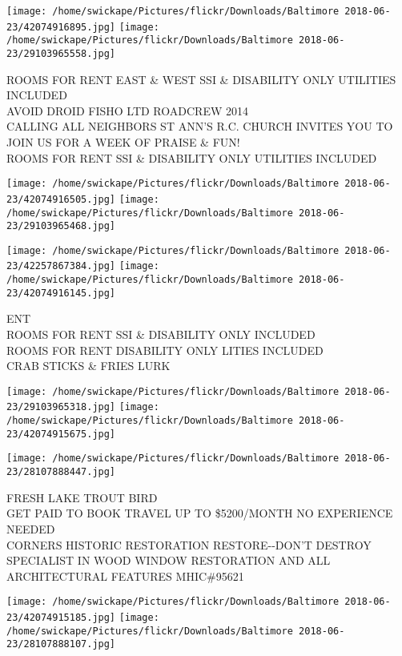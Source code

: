 \documentclass[10pt,letterpaper]{article}
\begin{document}
\texttt{[image: /home/swickape/Pictures/flickr/Downloads/Baltimore 2018-06-23/42074916895.jpg]}
\texttt{[image: /home/swickape/Pictures/flickr/Downloads/Baltimore 2018-06-23/29103965558.jpg]}

ROOMS FOR RENT EAST \& WEST SSI \& DISABILITY ONLY UTILITIES INCLUDED\\
AVOID DROID FISHO LTD ROADCREW 2014\\
CALLING ALL NEIGHBORS ST ANN'S R.C. CHURCH INVITES YOU TO JOIN US FOR A WEEK OF PRAISE \& FUN!\\
ROOMS FOR RENT SSI \& DISABILITY ONLY UTILITIES INCLUDED\\
\pagebreak

\texttt{[image: /home/swickape/Pictures/flickr/Downloads/Baltimore 2018-06-23/42074916505.jpg]}
\texttt{[image: /home/swickape/Pictures/flickr/Downloads/Baltimore 2018-06-23/29103965468.jpg]}

\texttt{[image: /home/swickape/Pictures/flickr/Downloads/Baltimore 2018-06-23/42257867384.jpg]}
\texttt{[image: /home/swickape/Pictures/flickr/Downloads/Baltimore 2018-06-23/42074916145.jpg]}

ENT\\
ROOMS FOR RENT SSI \& DISABILITY ONLY INCLUDED\\
ROOMS FOR RENT DISABILITY ONLY LITIES INCLUDED\\
CRAB STICKS \& FRIES LURK\\
\pagebreak

\texttt{[image: /home/swickape/Pictures/flickr/Downloads/Baltimore 2018-06-23/29103965318.jpg]}
\texttt{[image: /home/swickape/Pictures/flickr/Downloads/Baltimore 2018-06-23/42074915675.jpg]}

\vspace{0.25in}
\texttt{[image: /home/swickape/Pictures/flickr/Downloads/Baltimore 2018-06-23/28107888447.jpg]}

FRESH LAKE TROUT BIRD\\
GET PAID TO BOOK TRAVEL UP TO \$5200/MONTH NO EXPERIENCE NEEDED\\
CORNERS HISTORIC RESTORATION RESTORE{-}{-}DON'T DESTROY SPECIALIST IN WOOD WINDOW RESTORATION AND ALL ARCHITECTURAL FEATURES MHIC\#95621\\
\pagebreak

\texttt{[image: /home/swickape/Pictures/flickr/Downloads/Baltimore 2018-06-23/42074915185.jpg]}
\texttt{[image: /home/swickape/Pictures/flickr/Downloads/Baltimore 2018-06-23/28107888107.jpg]}
\end{document}
